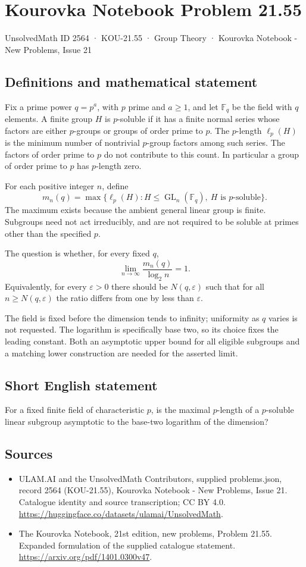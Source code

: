 \documentclass[11pt,a4paper]{article}
\begin{document}
\section*{Kourovka Notebook Problem 21.55}\label{2564}
{\small UnsolvedMath ID 2564 · KOU-21.55 · Group Theory · Kourovka Notebook - New Problems, Issue 21}
\subsection{Definitions and mathematical statement}
Fix a prime power $q=p^a$, with $p$ prime and $a\ge1$, and let
$\mathbb F_q$ be the field with $q$ elements.
A finite group $H$ is $p$-soluble if it has a finite normal series
whose factors are either $p$-groups or groups of order prime to $p$.
The $p$-length $\ell_p(H)$ is the minimum number of nontrivial
$p$-group factors among such series. The factors of order prime to
$p$ do not contribute to this count. In particular a group of order
prime to $p$ has $p$-length zero.

For each positive integer $n$, define
\[
 m_n(q)=\max\{\ell_p(H):H\le\operatorname{GL}_n(\mathbb F_q),
                                      \ H\text{ is }p\text{-soluble}\}.
\]
The maximum exists because the ambient general linear group is finite.
Subgroups need not act irreducibly, and are not required to be soluble
at primes other than the specified $p$.

The question is whether, for every fixed $q$,
\[
 \lim_{n\to\infty}\frac{m_n(q)}{\log_2 n}=1.
\]
Equivalently, for every $\varepsilon>0$ there should be $N(q,\varepsilon)$
such that for all $n\ge N(q,\varepsilon)$ the ratio differs from one
by less than $\varepsilon$.

The field is fixed before the dimension tends to infinity; uniformity
as $q$ varies is not requested. The logarithm is specifically base two,
so its choice fixes the leading constant. Both an asymptotic upper
bound for all eligible subgroups and a matching lower construction
are needed for the asserted limit.
\subsection{Short English statement}
For a fixed finite field of characteristic $p$, is the maximal $p$-length of a $p$-soluble linear subgroup asymptotic to the base-two logarithm of the dimension?
\subsection{Sources}
\begin{itemize}
\item[S1] ULAM.AI and the UnsolvedMath Contributors, supplied problems.json, record 2564 (KOU-21.55), Kourovka Notebook - New Problems, Issue 21. Catalogue identity and source transcription; CC BY 4.0.
\url{https://huggingface.co/datasets/ulamai/UnsolvedMath}.
\item[S2] The Kourovka Notebook, 21st edition, new problems, Problem 21.55. Expanded formulation of the supplied catalogue statement.
\url{https://arxiv.org/pdf/1401.0300v47}.
\end{itemize}
\end{document}
